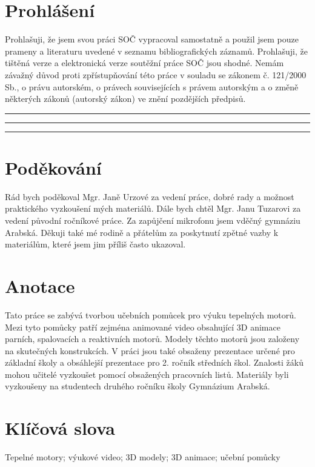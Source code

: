 \newpage

\section*{Prohlášení}
{Prohlašuji, že jsem svou práci SOČ vypracoval samostatně a použil jsem pouze prameny a literaturu uvedené v seznamu bibliografických záznamů.}\odst
{Prohlašuji, že tištěná verze a elektronická verze soutěžní práce SOČ jsou shodné.}\odst
{Nemám závažný důvod proti zpřístupňování této práce v souladu se zákonem č. 121/2000 Sb., o právu autorském, o právech souvisejících s právem autorským a o změně některých zákonů (autorský zákon) ve znění pozdějších předpisů.}\par
\vspace{2cm}
\noindent\rule{3cm}{0.4pt}
\noindent\rule{3cm}{0.4pt}
\hfill
{}
\noindent\rule{5cm}{0.4pt}

\newpage

\section*{Poděkování}
{Rád bych poděkoval Mgr. Janě Urzové za vedení práce, dobré rady a možnost praktického vyzkoušení mých materiálů. Dále bych chtěl Mgr. Janu Tuzarovi za vedení původní ročníkové práce. Za zapůjčení mikrofonu jsem vděčný gymnáziu Arabská. Děkuji také mé rodině a přátelům za poskytnutí zpětné vazby k materiálům, které jsem jim příliš často ukazoval.}

\newpage

\section*{Anotace}
{Tato práce se zabývá tvorbou učebních pomůcek pro výuku tepelných motorů. Mezi tyto pomůcky patří zejména animované video obsahující 3D animace parních, spalovacích a reaktivních motorů. Modely těchto motorů jsou založeny na skutečných konstrukcích. V práci jsou také obsaženy prezentace určené pro základní školy a obsáhlejší prezentace pro 2. ročník středních škol. Znalosti žáků mohou učitelé vyzkoušet pomocí obsažených pracovních listů. Materiály byli vyzkoušeny na studentech druhého ročníku školy Gymnázium Arabská.}

\section*{Klíčová slova}
{Tepelné motory; výukové video; 3D modely; 3D animace; učební pomůcky}

